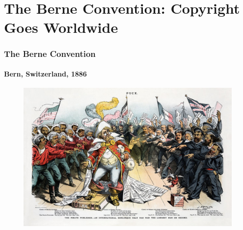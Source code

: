 \section{The Berne Convention: Copyright Goes Worldwide}

\begin{frame}
  \frametitle{The Berne Convention}
  \framesubtitle{Bern, Switzerland, 1886}

  \begin{figure}[h]
    \centering
    \includegraphics[scale=1.2]{images/pirate-publisher}
  \end{figure}

\end{frame}


